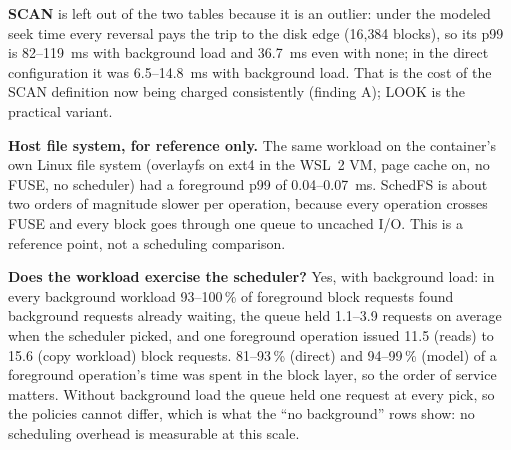 \documentclass[12pt,a4paper]{article}
\DeclareRobustCommand{\code}[1]{\texttt{\detokenize{#1}}}
\begin{document}
\noindent\textbf{SCAN} is left out of the two tables because it is an outlier: under the modeled seek time every reversal pays the trip to the disk edge (16{,}384 blocks), so its p99 is 82--119~ms with background load and 36.7~ms even with none; in the direct configuration it was 6.5--14.8~ms with background load. That is the cost of the SCAN definition now being charged consistently (finding A); LOOK is the practical variant.

\noindent\textbf{Host file system, for reference only.} The same workload on the container's own Linux file system (overlayfs on ext4 in the WSL~2 VM, page cache on, no FUSE, no scheduler) had a foreground p99 of 0.04--0.07~ms. SchedFS is about two orders of magnitude slower per operation, because every operation crosses FUSE and every block goes through one queue to uncached \code{O_DIRECT} I/O. This is a reference point, not a scheduling comparison.

\noindent\textbf{Does the workload exercise the scheduler?} Yes, with background load: in every background workload 93--100\,\% of foreground block requests found background requests already waiting, the queue held 1.1--3.9 requests on average when the scheduler picked, and one foreground operation issued 11.5 (reads) to 15.6 (copy workload) block requests. 81--93\,\% (direct) and 94--99\,\% (model) of a foreground operation's time was spent in the block layer, so the order of service matters. Without background load the queue held one request at every pick, so the policies cannot differ, which is what the ``no background'' rows show: no scheduling overhead is measurable at this scale.
\end{document}
